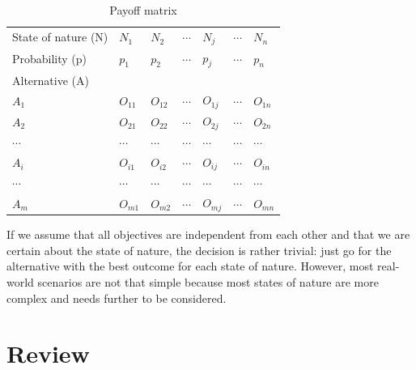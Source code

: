 \documentclass[
  12pt,
  oneside]{book}
\theoremstyle{definition}
\theoremstyle{definition}
\theoremstyle{definition}
\theoremstyle{definition}
\theoremstyle{remark}
\begin{document}
\begin{longtable}[]{@{}
  >{\raggedright\arraybackslash}p{}
  >{\raggedright\arraybackslash}p{}
  >{\raggedright\arraybackslash}p{}
  >{\raggedright\arraybackslash}p{}
  >{\raggedright\arraybackslash}p{}
  >{\raggedright\arraybackslash}p{}
  >{\raggedright\arraybackslash}p{}@{}}
\caption{Payoff matrix}\tabularnewline
\toprule()
\endhead
State of nature (N) & \(N_1\) & \(N_2\) & \(\cdots\) & \(N_j\) & \(\cdots\) & \(N_n\) \\
Probability (p) & \(p_1\) & \(p_2\) & \(\cdots\) & \(p_j\) & \(\cdots\) & \(p_n\) \\
Alternative (A) & & & & & & \\
\(A_1\) & \(O_{11}\) & \(O_{12}\) & \(\cdots\) & \(O_{1j}\) & \(\cdots\) & \(O_{1n}\) \\
\(A_2\) & \(O_{21}\) & \(O_{22}\) & \(\cdots\) & \(O_{2j}\) & \(\cdots\) & \(O_{2n}\) \\
\(\cdots\) & \(\cdots\) & \(\cdots\) & \(\cdots\) & \(\cdots\) & \(\cdots\) & \(\cdots\) \\
\(A_i\) & \(O_{i1}\) & \(O_{i2}\) & \(\cdots\) & \(O_{ij}\) & \(\cdots\) & \(O_{in}\) \\
\(\cdots\) & \(\cdots\) & \(\cdots\) & \(\cdots\) & \(\cdots\) & \(\cdots\) & \(\cdots\) \\
\(A_m\) & \(O_{m1}\) & \(O_{m2}\) & \(\cdots\) & \(O_{mj}\) & \(\cdots\) & \(O_{mn}\) \\
\bottomrule()
\end{longtable}

If we assume that all objectives are independent from each other and that we are certain about the state of nature, the decision is rather trivial: just go for the alternative with the best outcome for each state of nature. However, most real-world scenarios are not that simple because most states of nature are more complex and needs further to be considered.

\hypertarget{review}{%
\section{Review}\label{review}}
\end{document}
